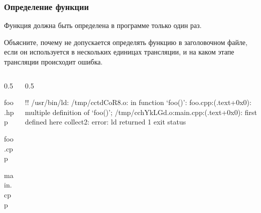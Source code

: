 \documentclass[compress, 8pt, aspectratio=169]{beamer}
\begin{document}
\begin{frame}[fragile]

    \frametitle{Определение функции}

    \hfill\break
    Функция должна быть определена в программе только один раз\footnotemark{}.


    \begin{task}
        Объясните, почему не допускается определять функцию в заголовочном файле,
        если он используется в нескольких единицах трансляции, и на каком этапе трансляции
        происходит ошибка.
    \end{task}

    \begin{columns}[T]

        \begin{column}{0.5\textwidth}

                {foo.hpp}

                {foo.cpp}

                {main.cpp}

        \end{column}

        \begin{column}{0.5\textwidth}

            \begin{terminalwindow}
!!
/usr/bin/ld: /tmp/cctdCoR8.o: in function `foo()':
foo.cpp:(.text+0x0): multiple definition of `foo()'; /tmp/cchYkLGd.o:main.cpp:(.text+0x0): first defined here
collect2: error: ld returned 1 exit status
            \end{terminalwindow}

        \end{column}

    \end{columns}

\end{frame}
\end{document}
